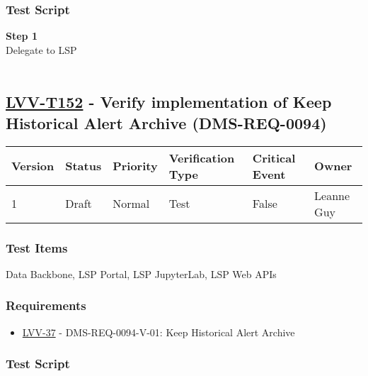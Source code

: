 \hypertarget{test-script-128}{%
\subsubsection{Test Script}\label{test-script-128}}

\textbf{Step 1}\\
Delegate to LSP\\
~\\

\hypertarget{lvv-t152---verify-implementation-of-keep-historical-alert-archive-dms-req-0094}{%
\subsection{\texorpdfstring{\href{https://jira.lsstcorp.org/secure/Tests.jspa\#/testCase/LVV-T152}{LVV-T152}
- Verify implementation of Keep Historical Alert Archive
(DMS-REQ-0094)}{LVV-T152 - Verify implementation of Keep Historical Alert Archive (DMS-REQ-0094)}}\label{lvv-t152---verify-implementation-of-keep-historical-alert-archive-dms-req-0094}}

\begin{longtable}[]{@{}llllll@{}}
\toprule
Version & Status & Priority & Verification Type & Critical Event &
Owner\tabularnewline
\midrule
\endhead
1 & Draft & Normal & Test & False & Leanne Guy\tabularnewline
\bottomrule
\end{longtable}

\hypertarget{test-items-128}{%
\subsubsection{Test Items}\label{test-items-128}}

Data Backbone, LSP Portal, LSP JupyterLab, LSP Web APIs~

\hypertarget{requirements-129}{%
\subsubsection{Requirements}\label{requirements-129}}

\begin{itemize}
\tightlist
\item
  \href{https://jira.lsstcorp.org/browse/LVV-37}{LVV-37} -
  DMS-REQ-0094-V-01: Keep Historical Alert Archive
\end{itemize}

\hypertarget{test-script-129}{%
\subsubsection{Test Script}\label{test-script-129}}

